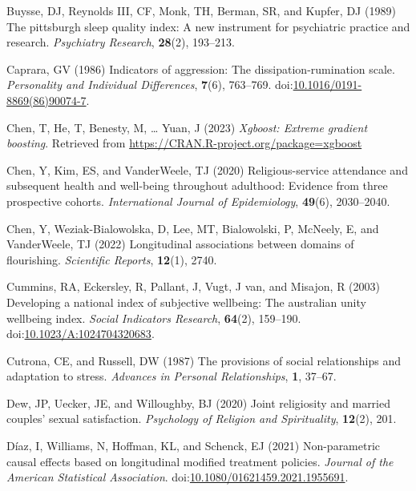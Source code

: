 \documentclass[
  single column]{article}
\newlength{\cslhangindent}
\newenvironment{CSLReferences}[2] %
 {\begin{list}{}{%
  \setlength{\itemindent}{0pt}
  \setlength{\leftmargin}{0pt}
  \setlength{\parsep}{0pt}
  \ifodd #1
   \setlength{\leftmargin}{\cslhangindent}
   \setlength{\itemindent}{-1\cslhangindent}
  \fi
  \setlength{\itemsep}{#2\baselineskip}}}
 {\end{list}}
\begin{document}
\begin{CSLReferences}{1}{0}
Buysse, DJ, Reynolds III, CF, Monk, TH, Berman, SR, and Kupfer, DJ
(1989) The pittsburgh sleep quality index: A new instrument for
psychiatric practice and research. \emph{Psychiatry Research},
\textbf{28}(2), 193--213.

Caprara, GV (1986) Indicators of aggression: The dissipation-rumination
scale. \emph{Personality and Individual Differences}, \textbf{7}(6),
763--769.
doi:\href{https://doi.org/10.1016/0191-8869(86)90074-7}{10.1016/0191-8869(86)90074-7}.

Chen, T, He, T, Benesty, M, \ldots{} Yuan, J (2023) \emph{Xgboost:
Extreme gradient boosting}. Retrieved from
\url{https://CRAN.R-project.org/package=xgboost}

Chen, Y, Kim, ES, and VanderWeele, TJ (2020) Religious-service
attendance and subsequent health and well-being throughout adulthood:
Evidence from three prospective cohorts. \emph{International Journal of
Epidemiology}, \textbf{49}(6), 2030--2040.

Chen, Y, Weziak-Bialowolska, D, Lee, MT, Bialowolski, P, McNeely, E, and
VanderWeele, TJ (2022) Longitudinal associations between domains of
flourishing. \emph{Scientific Reports}, \textbf{12}(1), 2740.

Cummins, RA, Eckersley, R, Pallant, J, Vugt, J van, and Misajon, R
(2003) Developing a national index of subjective wellbeing: The
australian unity wellbeing index. \emph{Social Indicators Research},
\textbf{64}(2), 159--190.
doi:\href{https://doi.org/10.1023/A:1024704320683}{10.1023/A:1024704320683}.

Cutrona, CE, and Russell, DW (1987) The provisions of social
relationships and adaptation to stress. \emph{Advances in Personal
Relationships}, \textbf{1}, 37--67.

Dew, JP, Uecker, JE, and Willoughby, BJ (2020) Joint religiosity and
married couples' sexual satisfaction. \emph{Psychology of Religion and
Spirituality}, \textbf{12}(2), 201.

Díaz, I, Williams, N, Hoffman, KL, and Schenck, EJ (2021) Non-parametric
causal effects based on longitudinal modified treatment policies.
\emph{Journal of the American Statistical Association}.
doi:\href{https://doi.org/10.1080/01621459.2021.1955691}{10.1080/01621459.2021.1955691}.


\end{CSLReferences}
\end{document}
